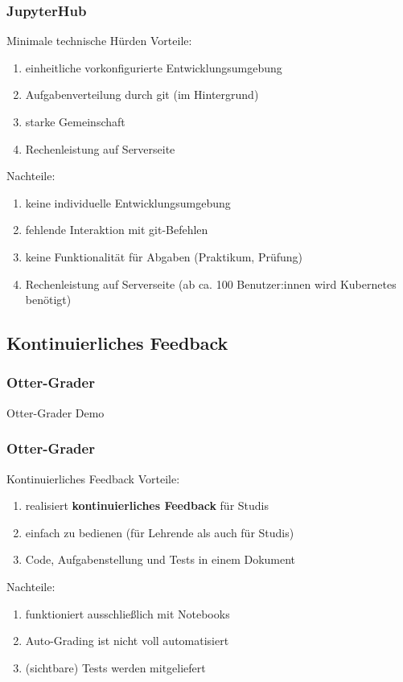 \documentclass[german,aspectratio=169]{beamer}
\begin{document}
\begin{frame}
	\frametitle{JupyterHub}
		\begin{block}{Minimale technische Hürden}
	Vorteile:
	\begin{enumerate}[label = $\bullet$]
		\item einheitliche vorkonfigurierte Entwicklungsumgebung
		\item Aufgabenverteilung durch git (im Hintergrund)
		\item starke Gemeinschaft
		\item Rechenleistung auf Serverseite
	\end{enumerate}
Nachteile:
\begin{enumerate}[label = $\bullet$]
	\item keine individuelle Entwicklungsumgebung
	\item fehlende Interaktion mit git-Befehlen
	\item keine Funktionalität für Abgaben (Praktikum, Prüfung)
	\item Rechenleistung auf Serverseite (ab ca. 100 Benutzer:innen wird Kubernetes benötigt)
\end{enumerate}
\end{block}
\end{frame}

\subsection{Kontinuierliches Feedback}

\begin{frame}
	\frametitle{Otter-Grader}
	\begin{center}
		Otter-Grader Demo
	\end{center}
\end{frame}

\begin{frame}
	\frametitle{Otter-Grader}
	\begin{block}{Kontinuierliches Feedback}
			Vorteile:
		\begin{enumerate}[label = $\bullet$]
			\item realisiert \textbf{kontinuierliches Feedback} für Studis
			\item einfach zu bedienen (für Lehrende als auch für Studis)
			\item Code, Aufgabenstellung und Tests in einem Dokument
		\end{enumerate}
		Nachteile:
		\begin{enumerate}[label = $\bullet$]
			\item funktioniert ausschließlich mit Notebooks
			\item Auto-Grading ist nicht voll automatisiert
			\item (sichtbare) Tests werden mitgeliefert
		\end{enumerate}
	\end{block}
\end{frame}
\end{document}
